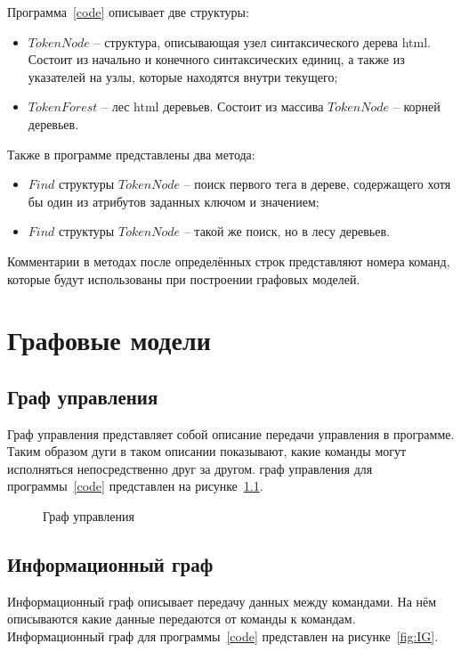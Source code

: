 Программа~\ref{code} описывает две структуры:
\begin{itemize}
	\item $TokenNode$ -- структура, описывающая узел синтаксического дерева html. Состоит из начально и конечного синтаксических единиц, а также из указателей на узлы, которые находятся внутри текущего;
	\item $TokenForest$ -- лес html деревьев. Состоит из массива $TokenNode$ -- корней деревьев.
\end{itemize}

Также в программе представлены два метода:

\begin{itemize}
	\item $Find$ структуры $TokenNode$ -- поиск первого тега в дереве, содержащего хотя бы один из атрибутов заданных ключом и значением;
	\item $Find$ структуры $TokenNode$ -- такой же поиск, но в лесу деревьев.
\end{itemize}

Комментарии в методах после определённых строк представляют номера команд, которые будут использованы при построении графовых моделей.

\chapter{Графовые модели}

\section{Граф управления}

Граф управления представляет собой описание передачи управления в программе. Таким образом дуги в таком описании показывают, какие команды могут исполняться непосредственно друг за другом. граф управления для программы~\ref{code} представлен на рисунке~\ref{fig:GU}.

\begin{figure}[H]
	\centering
	
	\caption{Граф управления}
	\label{fig:GU}
\end{figure}

\section{Информационный граф}

Информационный граф описывает передачу данных между командами. На нём описываются какие данные передаются от команды к командам. Информационный граф для программы~\ref{code} представлен на рисунке~\ref{fig:IG}.


